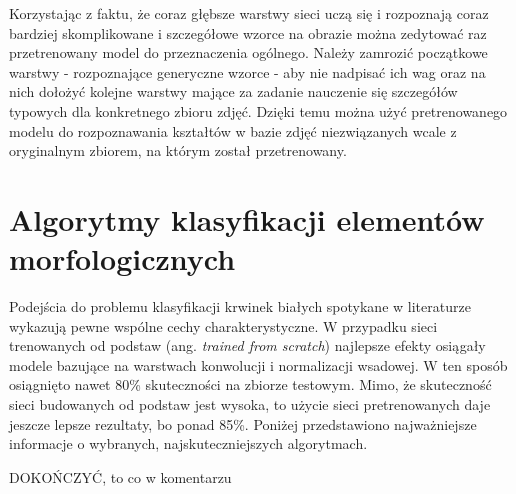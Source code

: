 Korzystając z faktu, że coraz głębsze warstwy sieci uczą się i rozpoznają coraz bardziej skomplikowane i szczegółowe wzorce na obrazie można zedytować raz przetrenowany model do przeznaczenia ogólnego. Należy zamrozić początkowe warstwy - rozpoznające generyczne wzorce - aby nie nadpisać ich wag oraz na nich dołożyć kolejne warstwy mające za zadanie nauczenie się szczegółów typowych dla konkretnego zbioru zdjęć. Dzięki temu można użyć pretrenowanego modelu do rozpoznawania kształtów w bazie zdjęć niezwiązanych wcale z oryginalnym zbiorem, na którym został przetrenowany. 


\section{Algorytmy klasyfikacji elementów morfologicznych}

Podejścia do problemu klasyfikacji krwinek białych spotykane w literaturze wykazują pewne wspólne cechy charakterystyczne. W przypadku sieci trenowanych od podstaw (ang. \textit{trained from scratch}) najlepsze efekty osiągały modele bazujące na warstwach konwolucji i normalizacji wsadowej. W ten sposób osiągnięto nawet 80\% skuteczności na zbiorze testowym. Mimo, że skuteczność sieci budowanych od podstaw jest wysoka, to użycie sieci pretrenowanych daje jeszcze lepsze rezultaty, bo ponad 85\%. Poniżej przedstawiono najważniejsze informacje o wybranych, najskuteczniejszych algorytmach.

DOKOŃCZYĆ, to co w komentarzu

